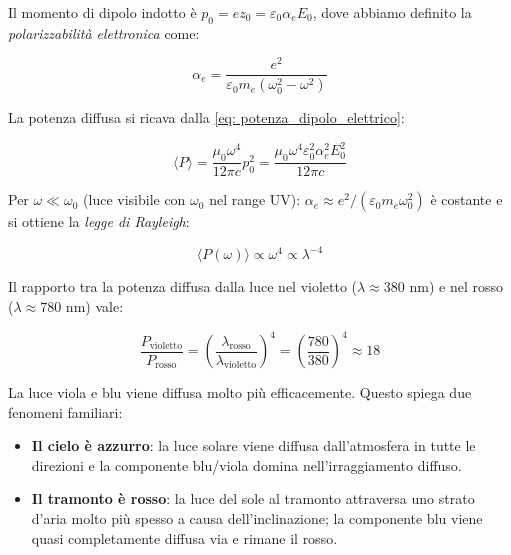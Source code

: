 Il momento di dipolo indotto è $p_0 = ez_0 = \varepsilon_0\alpha_e E_0$, dove abbiamo definito la \emph{polarizzabilità elettronica} come: 

\begin{equation}
    \alpha_e = \frac{e^2}{\varepsilon_0 m_e(\omega_0^2 - \omega^2)}
\end{equation}

La potenza diffusa si ricava dalla \eqref{eq: potenza_dipolo_elettrico}:

\begin{equation}
    \langle P \rangle = \frac{\mu_0\omega^4}{12\pi c}p_0^2 = \frac{\mu_0\omega^4\varepsilon_0^2\alpha_e^2 E_0^2}{12\pi c}
\end{equation}

Per $\omega \ll \omega_0$ (luce visibile con $\omega_0$ nel range UV): $\alpha_e \approx e^2/(\varepsilon_0 m_e\omega_0^2)$ è costante e si ottiene la \emph{legge di Rayleigh}: 

\begin{tcolorbox}[colback=yellow!10!white, colframe=orange!70!black, boxrule=0.8pt]
\begin{equation}
    \langle P(\omega) \rangle \propto \omega^4 \propto \lambda^{-4}
\end{equation}
\end{tcolorbox}

Il rapporto tra la potenza diffusa dalla luce nel violetto ($\lambda \approx 380$ nm) e nel rosso ($\lambda \approx 780$ nm) vale:

\begin{equation}
    \frac{P_{\text{violetto}}}{P_{\text{rosso}}} = \left(\frac{\lambda_{\text{rosso}}}{\lambda_{\text{violetto}}}\right)^4 = \left(\frac{780}{380}\right)^4 \approx 18
\end{equation}

La luce viola e blu viene diffusa molto più efficacemente. Questo spiega due fenomeni familiari:

\begin{itemize}
    \item \textbf{Il cielo è azzurro}: la luce solare viene diffusa dall'atmosfera in tutte le direzioni e la componente blu/viola domina nell'irraggiamento diffuso.

    \item \textbf{Il tramonto è rosso}: la luce del sole al tramonto attraversa uno strato d'aria molto più spesso a causa dell'inclinazione; la componente blu viene quasi completamente diffusa via e rimane il rosso.
\end{itemize}